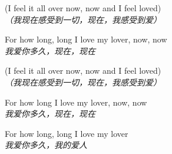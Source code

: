 \begin{spacing}{1.5}
\begin{flushleft}
(I feel it all over now, now and I feel loved)\\
\textit{（我现在感受到一切，现在，我感受到爱）}\lyricspace

For how long, long I love my lover, now, now\\
\textit{我爱你多久，现在，现在}\lyricspace

(I feel it all over now, now and I feel loved)\\
\textit{（我现在感受到一切，现在，我感受到爱）}\lyricspace

For how long I love my lover, now, now\\
\textit{我爱你多久，现在，现在}\lyricspace

For how long, long I love my lover\\
\textit{我爱你多久，我的爱人}\lyricspace
\end{flushleft}
\end{spacing} 
